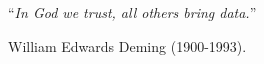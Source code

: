 \documentclass[
11pt, %
english, %
singlespacing, %
headsepline, %
]{mediaproject} %
\begin{document}
\cleardoublepage













\vspace*{0.2\textheight}

\begin{center}
\noindent\enquote{\itshape In God we trust, all others bring data.}\bigbreak  
\end{center}
\hfill William Edwards Deming (1900-1993).
\end{document}
